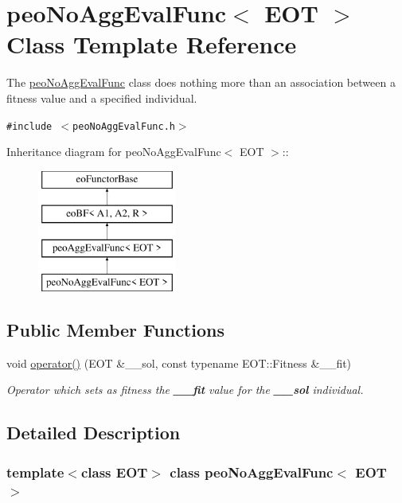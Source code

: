 \hypertarget{classpeoNoAggEvalFunc}{
\section{peo\-No\-Agg\-Eval\-Func$<$ EOT $>$ Class Template Reference}
\label{classpeoNoAggEvalFunc}
}
The \hyperlink{classpeoNoAggEvalFunc}{peo\-No\-Agg\-Eval\-Func} class does nothing more than an association between a fitness value and a specified individual.  


{\tt \#include $<$peo\-No\-Agg\-Eval\-Func.h$>$}

Inheritance diagram for peo\-No\-Agg\-Eval\-Func$<$ EOT $>$::\begin{figure}[H]
\begin{center}
\leavevmode
\includegraphics[height=4cm]{classpeoNoAggEvalFunc}
\end{center}
\end{figure}
\subsection*{Public Member Functions}
\begin{CompactItemize}
\item 
void \hyperlink{classpeoNoAggEvalFunc_1a69ee1af8745ac75c864bf884436de5}{operator()} (EOT \&\_\-\_\-sol, const typename EOT::Fitness \&\_\-\_\-fit)
\begin{CompactList}\small\item\em Operator which sets as fitness the {\bf \_\-\_\-fit} value for the {\bf \_\-\_\-sol} individual. \item\end{CompactList}\end{CompactItemize}


\subsection{Detailed Description}
\subsubsection*{template$<$class EOT$>$ class peo\-No\-Agg\-Eval\-Func$<$ EOT $>$}

